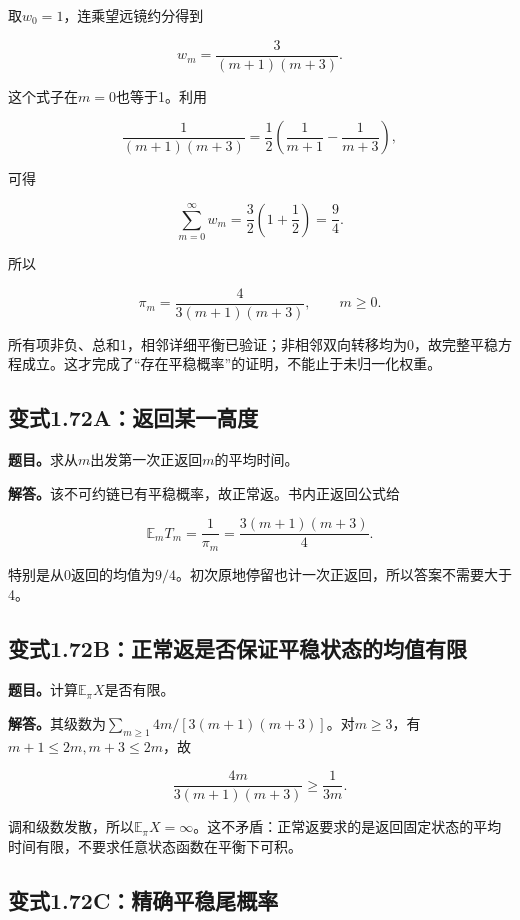 \documentclass[
  11pt,a4paper,UTF8,fontset=fandol]{ctexart}
\begin{document}
取\(w_0=1\)，连乘望远镜约分得到

\[w_m=\frac3{(m+1)(m+3)}.\]

这个式子在\(m=0\)也等于1。利用

\[\frac1{(m+1)(m+3)}=\frac12\left(\frac1{m+1}-\frac1{m+3}\right),\]

可得

\[\sum_{m=0}^\infty w_m=\frac32\left(1+\frac12\right)=\frac94.\]

所以

\[\boxed{\pi_m=\frac4{3(m+1)(m+3)},\qquad m\ge0.}\]

所有项非负、总和1，相邻详细平衡已验证；非相邻双向转移均为0，故完整平稳方程成立。这才完成了``存在平稳概率''的证明，不能止于未归一化权重。

\subsection{变式1.72A：返回某一高度}\label{ux53d8ux5f0f1.72aux8fd4ux56deux67d0ux4e00ux9ad8ux5ea6}

\textbf{题目。}求从\(m\)出发第一次正返回\(m\)的平均时间。

\textbf{解答。}该不可约链已有平稳概率，故正常返。书内正返回公式给

\[\boxed{\mathbb E_mT_m=\frac1{\pi_m}=\frac{3(m+1)(m+3)}4.}\]

特别是从0返回的均值为\(9/4\)。初次原地停留也计一次正返回，所以答案不需要大于4。

\subsection{变式1.72B：正常返是否保证平稳状态的均值有限}\label{ux53d8ux5f0f1.72bux6b63ux5e38ux8fd4ux662fux5426ux4fddux8bc1ux5e73ux7a33ux72b6ux6001ux7684ux5747ux503cux6709ux9650}

\textbf{题目。}计算\(\mathbb E_\pi X\)是否有限。

\textbf{解答。}其级数为\(\sum_{m\ge1}4m/[3(m+1)(m+3)]\)。对\(m\ge3\)，有\(m+1\le2m,m+3\le2m\)，故

\[\frac{4m}{3(m+1)(m+3)}\ge\frac1{3m}.\]

调和级数发散，所以\(\boxed{\mathbb E_\pi X=\infty}\)。这不矛盾：正常返要求的是返回固定状态的平均时间有限，不要求任意状态函数在平衡下可积。

\subsection{变式1.72C：精确平稳尾概率}\label{ux53d8ux5f0f1.72cux7cbeux786eux5e73ux7a33ux5c3eux6982ux7387}
\end{document}
